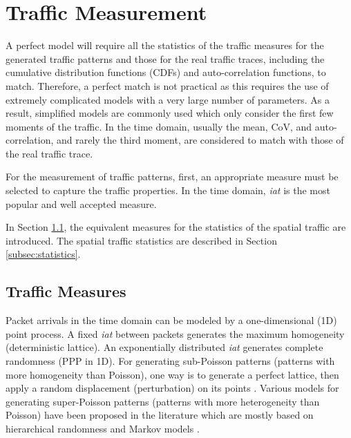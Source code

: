 \documentclass[journal]{IEEEtran}
\begin{document}
\section{Traffic Measurement}
\label{sec:measurement}

A perfect model will require all the statistics of the traffic measures for the generated traffic patterns and those for the real traffic traces, including the cumulative distribution functions (CDFs) and auto-correlation functions, to match. Therefore, a perfect match is not practical as this requires the use of extremely complicated models with a very large number of parameters. As a result, simplified models are commonly used which only consider the first few moments of the traffic. In the time domain, usually the mean, CoV, and auto-correlation, and rarely the third moment, are considered to match with those of the real traffic trace. 

For the measurement of traffic patterns, first, an appropriate measure must be selected to capture the traffic properties. In the time domain, \textit{iat} is the most popular and well accepted measure.

In Section \ref{subsec:measures}, the equivalent measures for the statistics of the spatial traffic are introduced. The spatial traffic statistics are described in Section \ref{subsec:statistics}.













\subsection{Traffic Measures}
\label{subsec:measures}

Packet arrivals in the time domain can be modeled by a one-dimensional (1D) point process. A fixed \textit{iat} between packets generates the maximum homogeneity (deterministic lattice). An exponentially distributed \textit{iat} generates complete randomness (PPP in 1D). For generating sub-Poisson patterns (patterns with more homogeneity than Poisson), one way is to generate a perfect lattice, then apply a random displacement (perturbation) on its points \cite{rataj1993convergence,lucarini2008symmetry}. Various models for generating super-Poisson patterns (patterns with more heterogeneity than Poisson) have been proposed in the literature which are mostly based on hierarchical randomness and Markov models \cite{paxson1995wide, dainotti2008internet, xie2012modeling}.
\end{document}
